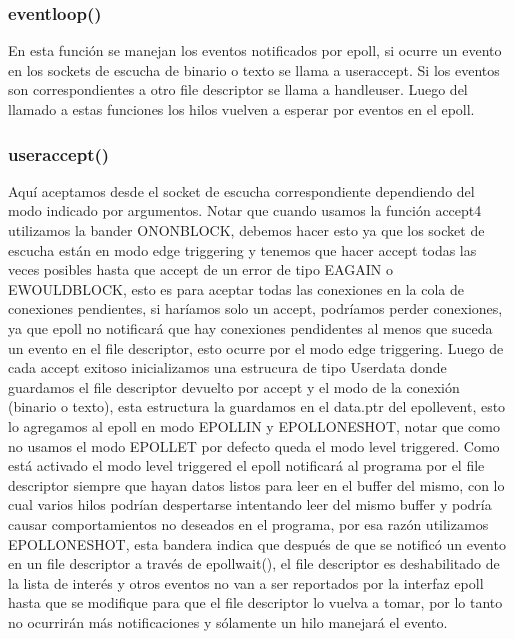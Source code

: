 \documentclass{article}
\begin{document}
\subsubsection{eventloop()}
En esta función se manejan los eventos notificados por epoll,
si ocurre un evento en los sockets de escucha de binario
o texto se llama a user\textunderscore accept. Si los
eventos son correspondientes a otro file descriptor se
llama a handle\textunderscore user. Luego del llamado
a estas funciones los hilos vuelven a esperar por eventos
en el epoll.

\subsubsection{user\textunderscore accept()}
Aquí aceptamos desde el socket de escucha correspondiente
dependiendo del modo indicado por argumentos. Notar que
cuando usamos la función accept4 utilizamos la bander
O\textunderscore NONBLOCK, debemos hacer esto ya que
los socket de escucha están en modo edge triggering y
tenemos que hacer accept todas las veces posibles hasta
que accept de un error de tipo EAGAIN o EWOULDBLOCK,
esto es para aceptar todas las conexiones en la cola de 
conexiones pendientes, si haríamos solo un accept,
podríamos perder conexiones, ya que epoll no notificará
que hay conexiones pendidentes al menos que suceda
un evento en el file descriptor, esto ocurre por el
modo edge triggering. Luego de cada accept exitoso
inicializamos una estrucura de tipo 
User\textunderscore data donde guardamos el file 
descriptor devuelto por accept y el modo de la
conexión (binario o texto), esta estructura
la guardamos en el data.ptr del 
epoll\textunderscore event, esto lo agregamos
al epoll en modo EPOLLIN y EPOLLONESHOT, notar
que como no usamos el modo EPOLLET por defecto
queda el modo level triggered. Como está activado
el modo level triggered el epoll notificará al 
programa por el file descriptor siempre que hayan
datos listos para leer en el buffer del mismo, con
lo cual varios hilos podrían despertarse intentando
leer del mismo buffer y podría causar comportamientos
no deseados en el programa, por esa razón utilizamos
EPOLLONESHOT, esta bandera indica que después de que se
notificó un evento en un file descriptor a través de
epoll\textunderscore wait(), el file descriptor es 
deshabilitado de la lista de interés y otros eventos no
van a ser reportados por la interfaz epoll hasta que
se modifique para que el file descriptor lo vuelva a tomar,
por lo tanto no ocurrirán más notificaciones y sólamente
un hilo manejará el evento.
\end{document}
